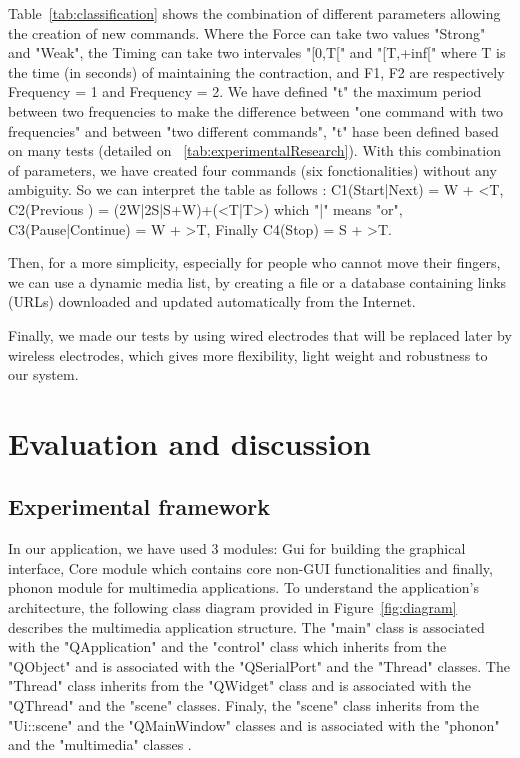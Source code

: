 \documentclass[conference]{IEEEtran}
\begin{document}
Table~\ref{tab:classification} shows the combination of different parameters allowing the creation of new commands. Where the Force can take two values
"Strong" and "Weak", the Timing can take two intervales "[0,T[" and "[T,+inf[" where T is the time (in seconds) of maintaining the contraction, and F1, F2 are
respectively Frequency = 1 and Frequency = 2. We have defined "t" the maximum period between two frequencies to make the difference
between "one command with two frequencies" and between "two different commands", "t" hase been defined based on many tests (detailed on ~\ref{tab:experimentalResearch}).
With this combination of parameters, we have created four commands (six fonctionalities) without any ambiguity.
So we can interpret the table as follows : C1(Start|Next) =  W + <T, C2(Previous
) = (2W|2S|S+W)+(<T|T>) which "|" means "or", C3(Pause|Continue) = W + >T, Finally C4(Stop) = S + >T.\par
Then, for a more simplicity, especially for people who cannot move their fingers, we can use a dynamic media list, by creating a file or a database containing
links (URLs) downloaded and updated automatically from the Internet.\par
Finally, we made our tests by using wired electrodes that will be replaced later by wireless electrodes, which gives more flexibility,
light weight and robustness to our system.\par


\section{Evaluation and discussion}
\label{sec:experimentalResearch}

\subsection{Experimental framework}

In our application, we have used 3 modules: Gui for building the graphical interface, Core module which contains core non-GUI functionalities and finally,
phonon module for multimedia applications.
To understand the application's architecture, the following class diagram provided in Figure~\ref{fig:diagram} describes the multimedia application structure.
The "main" class is associated with the "QApplication" and the "control" class which inherits from the "QObject" and is associated with the "QSerialPort"
and the "Thread" classes. The "Thread" class inherits from the "QWidget" class and is associated with the "QThread" and the "scene" classes. Finaly, the
"scene" class inherits from the "Ui::scene" and the "QMainWindow" classes  and is associated with the "phonon" and the "multimedia" classes .
\end{document}

